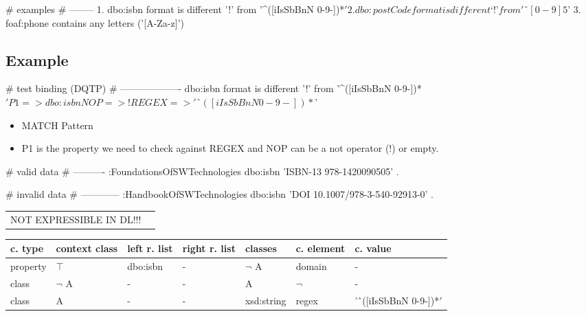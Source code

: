 \documentclass{llncs}
\newenvironment{gcotable}{
  \scriptsize
  \sffamily
  \vspace{0.3cm}
	\begin{center}
  \begin{tabular}{l|l|l|l|l|l|l}
  \hline
  \textbf{c. type} & \textbf{context class} & \textbf{left r. list} & \textbf{right r. list} & \textbf{classes} & \textbf{c. element} & \textbf{c. value} \\
  \hline

}{
  \hline
  \end{tabular}
	\end{center}
}
\newenvironment{DL}{
	\begin{center}
  \begin{tabular}{r l}

}{
  \end{tabular}
	\end{center}
}
\begin{document}
\begin{ex}
# examples
# --------
1. dbo:isbn format is different ’!’ from '^([iIsSbBnN 0-9-])*$'
2. dbo:postCode format is different ‘!’ from 'ˆ[0-9]{5}$'
3. foaf:phone contains any letters ('[A-Za-z]')
\end{ex}

\subsection{Example}

\begin{ex}
# test binding (DQTP)
# -------------------
dbo:isbn format is different ’!’ from '^([iIsSbBnN 0-9-])*$'

P1 => dbo:isbn
NOP => !
REGEX => 'ˆ([iIsSbBnN 0-9-])*$'
\end{ex}


\begin{itemize}
	\item MATCH Pattern \cite{Kontokostas2014} 
  \item P1 is the property we need to check against REGEX and
NOP can be a not operator (!) or empty.
\end{itemize}

\begin{ex}
# valid data
# ----------
:FoundationsOfSWTechnologies
    dbo:isbn 'ISBN-13 978-1420090505' .
\end{ex}

\begin{ex}
# invalid data
# ------------
:HandbookOfSWTechnologies
    dbo:isbn 'DOI 10.1007/978-3-540-92913-0' .
\end{ex}

\begin{DL}
NOT EXPRESSIBLE IN DL!!!
\end{DL}

\begin{gcotable}
property & $\top$ & dbo:isbn & - & $\neg$ A & domain & - \\
class & $\neg$ A & - & - & A & $\neg$ & - \\
class & A & - & - & xsd:string & regex & 'ˆ([iIsSbBnN 0-9-])*$' $ \\
\end{gcotable}
\end{document}
